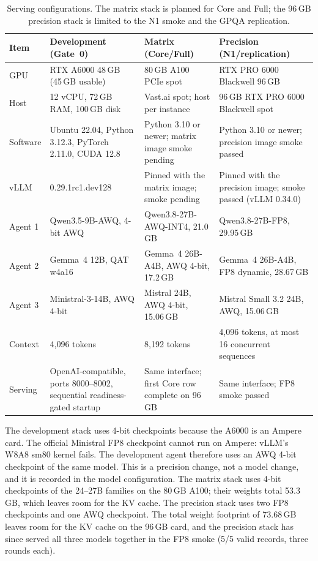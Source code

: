 \begin{table}[H]
  \centering
  \caption{Serving configurations. The matrix stack is planned for Core and Full; the 96\,GB precision stack is limited to the N1 smoke and the GPQA replication.}
  \renewcommand{\arraystretch}{1.3}
  \scriptsize
  \begin{tabular}{|p{}|p{}|p{}|p{}|}
    \hline
    Item & Development (Gate~0) & Matrix (Core/Full) & Precision (N1/replication) \\
    \hline
    GPU & RTX A6000 48\,GB (45\,GB usable) & 80\,GB A100 PCIe spot & RTX PRO 6000 Blackwell 96\,GB \\
    \hline
    Host & 12 vCPU, 72\,GB RAM, 100\,GB disk & Vast.ai spot; host per instance & 96\,GB RTX PRO 6000 Blackwell spot \\
    \hline
    Software & Ubuntu 22.04, Python 3.12.3, PyTorch 2.11.0, CUDA 12.8 & Python 3.10 or newer; matrix image smoke pending & Python 3.10 or newer; precision image smoke passed \\
    \hline
    vLLM & 0.29.1rc1.dev128 & Pinned with the matrix image; smoke pending & Pinned with the precision image; smoke passed (vLLM 0.34.0) \\
    \hline
    Agent 1 & Qwen3.5-9B-AWQ, 4-bit AWQ & Qwen3.8-27B-AWQ-INT4, 21.0\,GB & Qwen3.8-27B-FP8, 29.95\,GB \\
    \hline
    Agent 2 & Gemma~4 12B, QAT w4a16 & Gemma~4 26B-A4B, AWQ 4-bit, 17.2\,GB & Gemma~4 26B-A4B, FP8 dynamic, 28.67\,GB \\
    \hline
    Agent 3 & Ministral-3-14B, AWQ 4-bit & Mistral 24B, AWQ 4-bit, 15.06\,GB & Mistral Small 3.2 24B, AWQ, 15.06\,GB \\
    \hline
    Context & 4{,}096 tokens & 8{,}192 tokens & 4{,}096 tokens, at most 16 concurrent sequences \\
    \hline
    Serving & OpenAI-compatible, ports 8000--8002, sequential readiness-gated startup & Same interface; first Core row complete on 96\,GB & Same interface; FP8 smoke passed \\
    \hline
  \end{tabular}
  \label{tab:stack}
\end{table}

The development stack uses 4-bit checkpoints because the A6000 is an Ampere card. The official Ministral FP8 checkpoint cannot run on Ampere: vLLM's W8A8 sm80 kernel fails. The development agent therefore uses an AWQ 4-bit checkpoint of the same model. This is a precision change, not a model change, and it is recorded in the model configuration. The matrix stack uses 4-bit checkpoints of the 24--27B families on the 80\,GB A100; their weights total 53.3\,GB, which leaves room for the KV cache. The precision stack uses two FP8 checkpoints and one AWQ checkpoint. The total weight footprint of 73.68\,GB leaves room for the KV cache on the 96\,GB card, and the precision stack has since served all three models together in the FP8 smoke (5/5 valid records, three rounds each).

